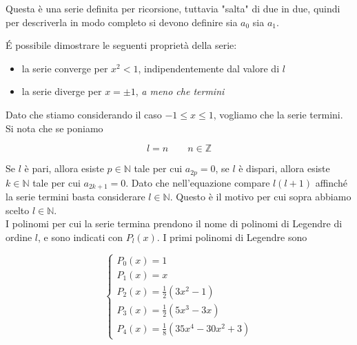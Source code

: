 Questa è una serie definita per ricorsione, tuttavia "salta" di due in due, quindi per descriverla in modo completo si devono definire sia $a_0$ sia $a_1$. \\

\newpage

\' E possibile dimostrare le seguenti proprietà della serie:

\begin{itemize}
    \item la serie converge per $x^2 < 1$, indipendentemente dal valore di $l$
    \item la serie diverge per $x = \pm 1$, \emph{a meno che termini}
\end{itemize}

Dato che stiamo considerando il caso $-1 \leq x \leq 1$, vogliamo che la serie termini. \\

Si nota che se poniamo 

\begin{equation*}
    l = n \qquad n\in \mathbb{Z}
\end{equation*}

Se $l$ è pari, allora esiste $p \in \mathbb{N}$ tale per cui $a_{2p} = 0$, se $l$ è dispari, allora esiste $k \in \mathbb{N}$ tale per cui $a_{2k +1} = 0$. Dato che nell'equazione compare $l(l+1)$ affinché la serie termini basta considerare $l \in \mathbb{N}$. Questo è il motivo per cui sopra abbiamo scelto $l \in \mathbb{N}$.\\

I polinomi per cui la serie termina prendono il nome  di polinomi di Legendre di ordine $l$, e sono indicati con $P_l (x)$. I primi polinomi di Legendre sono 

\begin{tcolorbox}[colback=yellow!10!white, colframe=orange!70!black, boxrule=0.8pt]
\begin{equation*}
    \begin{cases}
        P_0(x) = 1\\
        P_1(x) = x\\
        P_2(x) = \frac{1}{2}(3x^2 - 1)\\
        P_3(x) = \frac{1}{2}(5 x^3 - 3x)\\
        P_4(x) = \frac{1}{8} (35 x^4 - 30 x^2 + 3)
    \end{cases}
\end{equation*}
\end{tcolorbox}

